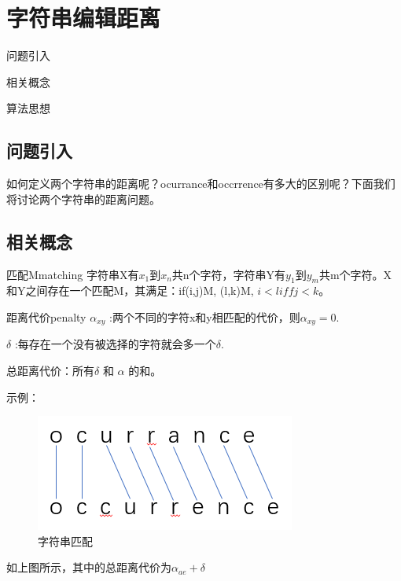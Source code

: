 \chapter{字符串编辑距离}

\begin{introduction}
	\item 问题引入
	\item 相关概念
	\item 算法思想
\end{introduction}

\section{问题引入}
如何定义两个字符串的距离呢？ocurrance和occrrence有多大的区别呢？下面我们将讨论两个字符串的距离问题。
\section{相关概念}
\begin{definition}{匹配M}{matching}
	字符串X有$x_1$到$x_n$共n个字符，字符串Y有$y_1$到$y_m$共m个字符。X和Y之间存在一个匹配M，其满足：if(i,j)\in M, (l,k)\in M, $i<l iff j<k$。
\end{definition}





\begin{definition}{距离代价}{penalty}
$\alpha_{xy}$ :两个不同的字符x和y相匹配的代价，则$\alpha_{xy}=0$.

$\delta$ :每存在一个没有被选择的字符就会多一个$\delta$.

总距离代价：所有$\delta$ 和 $\alpha$ 的和。
\end{definition}

示例：

\begin{figure}[htb]
	\centering
	\includegraphics[scale=0.6]{image/connect1.png}
	\caption{字符串匹配}\label{fig:connect1}
\end{figure}
如上图所示，其中的总距离代价为$\alpha_{ae} + \delta$

